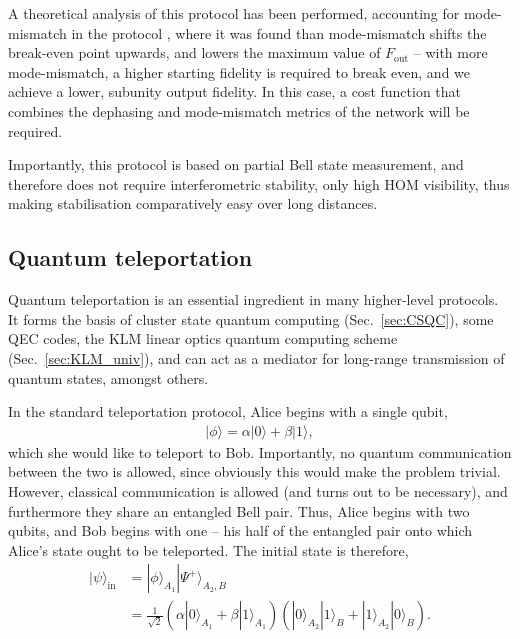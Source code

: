 \documentclass[aps,rmp,twocolumn,amsmath,amssymb,nofootinbib,superscriptaddress,longbibliography,floatfix]{revtex4-1}
\newcommand{\ket}[1]{|#1\rangle}
\begin{document}
A theoretical analysis of this protocol has been performed, accounting for mode-mismatch in the protocol \cite{bib:RohdeOptEntPur06}, where it was found than mode-mismatch shifts the break-even point upwards, and lowers the maximum value of $F_\mathrm{out}$ -- with more mode-mismatch, a higher starting fidelity is required to break even, and we achieve a lower, subunity output fidelity. In this case, a cost function that combines the dephasing and mode-mismatch metrics of the network will be required.

Importantly, this protocol is based on partial Bell state measurement, and therefore does not require interferometric stability, only high HOM visibility, thus making stabilisation comparatively easy over long distances.

%
%

\subsection{Quantum teleportation} \label{sec:teleport}

Quantum teleportation \cite{???} is an essential ingredient in many higher-level protocols. It forms the basis of cluster state quantum computing (Sec.~\ref{sec:CSQC}), some QEC codes, the KLM linear optics quantum computing scheme (Sec.~\ref{sec:KLM_univ}), and can act as a mediator for long-range transmission of quantum states, amongst others.

In the standard teleportation protocol, Alice begins with a single qubit,
\begin{align}
\ket\phi = \alpha\ket{0} +\beta\ket{1},
\end{align}
which she would like to teleport to Bob. Importantly, no quantum communication between the two is allowed, since obviously this would make the problem trivial. However, classical communication is allowed (and turns out to be necessary), and furthermore they share an entangled Bell pair. Thus, Alice begins with two qubits, and Bob begins with one -- his half of the entangled pair onto which Alice's state ought to be teleported. The initial state is therefore,
\begin{align}
\ket\psi_\mathrm{in} &= \ket{\phi}_{A_1} \ket{\Psi^+}_{A_2,B} \nonumber \\
&= \frac{1}{\sqrt{2}} (\alpha\ket{0}_{A_1}+\beta\ket{1}_{A_1}) (\ket{0}_{A_2}\ket{1}_B + \ket{1}_{A_2}\ket{0}_B).
\end{align}
\end{document}
